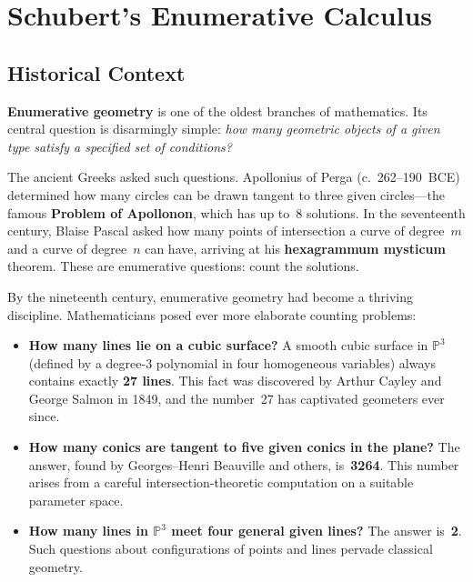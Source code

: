
\chapter{Schubert's Enumerative Calculus}

\section{Historical Context}

\textbf{Enumerative geometry} is one of the oldest branches of mathematics. Its central question is disarmingly simple: \emph{how many geometric objects of a given type satisfy a specified set of conditions?}

The ancient Greeks asked such questions. Apollonius of Perga (c.~262--190~BCE) determined how many circles can be drawn tangent to three given circles---the famous \textbf{Problem of Apollonon}, which has up to~8 solutions. In the seventeenth century, Blaise Pascal asked how many points of intersection a curve of degree~$m$ and a curve of degree~$n$ can have, arriving at his \textbf{hexagrammum mysticum} theorem. These are enumerative questions: count the solutions.

By the nineteenth century, enumerative geometry had become a thriving discipline. Mathematicians posed ever more elaborate counting problems:

\begin{itemize}
    \item \textbf{How many lines lie on a cubic surface?} A smooth cubic surface in $\mathbb{P}^3$ (defined by a degree-3 polynomial in four homogeneous variables) always contains exactly \textbf{27 lines}. This fact was discovered by Arthur Cayley and George Salmon in 1849, and the number~27 has captivated geometers ever since.

    \item \textbf{How many conics are tangent to five given conics in the plane?} The answer, found by Georges--Henri Beauville and others, is~\textbf{3264}. This number arises from a careful intersection-theoretic computation on a suitable parameter space.

    \item \textbf{How many lines in $\mathbb{P}^3$ meet four general given lines?} The answer is~\textbf{2}. Such questions about configurations of points and lines pervade classical geometry.
\end{itemize}

